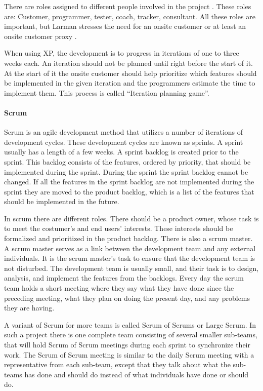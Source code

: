 There are roles assigned to different people involved in the project \cite[p.~145]{Larman04}.
These roles are: Customer, programmer, tester, coach, tracker, consultant.
All these roles are important, but Larman stresses the need for an onsite customer or at least an onsite customer proxy \cite[p.~152-156]{Larman04}.

When using XP, the development is to progress in iterations of one to three weeks each.
An iteration should not be planned until right before the start of it.
At the start of it the onsite customer should help prioritize which features should be implemented in the given iteration and the programmers estimate the time to implement them.
This process is called ``Iteration planning game''.

\paragraph{Scrum}
Scrum is an agile development method that utilizes a number of iterations of development cycles.
These development cycles are known as sprints.
A sprint usually has a length of a few weeks.
A sprint backlog is created prior to the sprint. 
This backlog consists of the features, ordered by priority, that should be implemented during the sprint.
During the sprint the sprint backlog cannot be changed.
If all the features in the sprint backlog are not implemented during the sprint they are moved to the product backlog, which is a list of the features that should be implemented in the future.

In scrum there are different roles. 
There should be a product owner, whose task is to meet the costumer's and end users' interests. 
These interests should be formalized and prioritized in the product backlog.
There is also a scrum master. 
A scrum master serves as a link between the development team and any external individuals.
It is the scrum master's task to ensure that the development team is not disturbed.
The development team is usually small, and their task is to design, analysis, and implement the features from the backlogs.
Every day the scrum team holds a short meeting where they say what they have done since the preceding meeting, what they plan on doing the present day, and any problems they are having.

A variant of Scrum for more teams is called Scrum of Scrums or Large Scrum.
In such a project there is one complete team consisting of several smaller sub-teams, that will hold Scrum of Scrum meetings during each sprint to synchronize their work.
The Scrum of Scrum meeting is similar to the daily Scrum meeting with a representative from each sub-team, except that they talk about what the sub-teams has done and should do instead of what individuals have done or should do.


